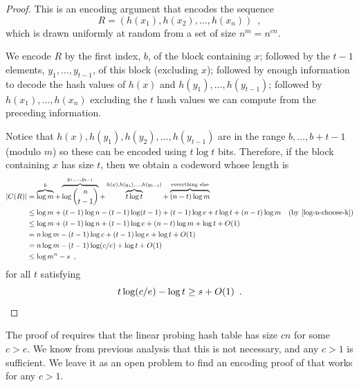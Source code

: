 \documentclass{patmorin}
\begin{document}
\begin{proof}
  This is an encoding argument that encodes the sequence
  \[
    R = (h(x_1),h(x_2),\ldots,h(x_n)) \enspace ,
  \]
  which is drawn uniformly at random from a set of size
  $n^{m}=n^{cn}$.
  
  We encode $R$ by the first index, $b$, of the block containing $x$;
  followed by the $t-1$ elements, $y_1,\ldots,y_{t-1}$, of this block
  (excluding $x$); followed by enough information to decode the hash
  values of $h(x)$ and $h(y_1),\ldots,h(y_{t-1})$; followed by
  $h(x_1),\ldots,h(x_n)$ excluding the $t$ hash values we can compute
  from the preceding information.

  Notice that $h(x),h(y_1),h(y_2),\ldots,h(y_{t-1})$ are in the range
  $b,\ldots,b+t-1$ (modulo $m$) so these can be encoded using
  $t\log t$ bits.  Therefore, if the block containing $x$ has size
  $t$, then we obtain a codeword whose length is
  \begin{align*}
    |C(R)| & = \overbrace{\log m}^{b} + \overbrace{\log\binom{n}{t-1}}^{y_1,\ldots,y_{t-1}} + \overbrace{t\log t}^{h(x),h(y_1),\ldots,h(y_{t-1})} + \overbrace{(n-t)\log m}^{\text{everything else}} \\
           & \le \log m + (t-1)\log n - 
             (t-1)\log(t-1) + (t-1)\log e + t\log t + (n-t)\log m & \text{(by \eqref{log-n-choose-k})}\\
           & \le \log m + (t-1)\log n + (t-1)\log e + (n-t)\log m + \log t+ O(1)\\
           & = n\log m - (t-1)\log c + (t-1)\log e + \log t + O(1) \\
           & = n\log m - (t-1)\log(c/e) + \log t + O(1) \\
           & \le \log m^n - s \enspace ,
  \end{align*}
  for all $t$ satisfying
  \[
    t \log (c/e) - \log t \ge s + O(1) \enspace . \qedhere
  \]
\end{proof}

\begin{rem}
  The proof of  requires that the linear
  probing hash table has size $cn$ for some $c>e$.  We know from
  previous analysis that this is not necessary, and any $c>1$ is
  sufficient. We leave it as an open problem to find an encoding proof
  of  that works for any $c>1$.
\end{rem}
\end{document}
